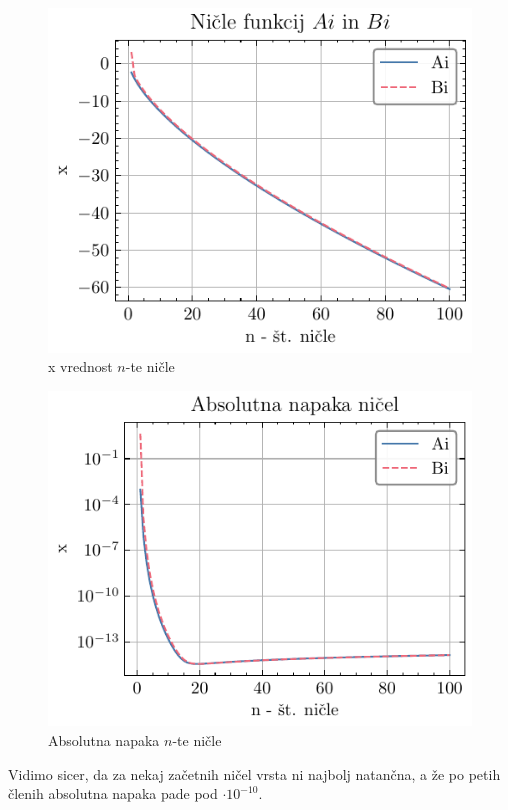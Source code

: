 \documentclass[slovene,11pt,a4paper]{article}
\newcommand{\ee}[1]{\cdot 10^{#1}}
\begin{document}
\begin{figure}[ht]
\begin{center}
  \includegraphics[width=13cm]{graphs/nicle_draw.pdf}
  \caption{x vrednost $n$-te ničle}
  \label{nicle draw}
\end{center}
\end{figure}


\begin{figure}[ht]
\begin{center}
  \includegraphics[width=13cm]{graphs/nicle_err.pdf}
  \caption{Absolutna napaka $n$-te ničle}
  \label{nicle err}
\end{center}
\end{figure}
Vidimo sicer, da za nekaj začetnih ničel vrsta ni najbolj natančna, a že po petih členih absolutna napaka pade pod $\ee{-10}$.


\newpage


\end{document}
